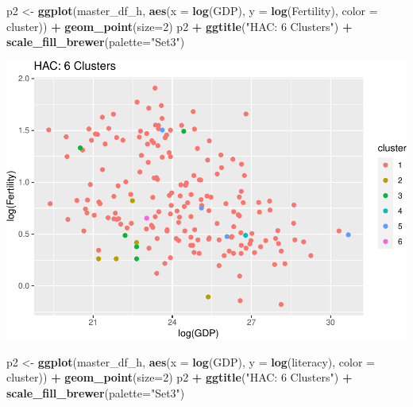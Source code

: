 \documentclass[]{article}
\newenvironment{Shaded}{\begin{snugshade}}{\end{snugshade}}
\newcommand{\DataTypeTok}[1]{\textcolor[rgb]{0.13,0.29,0.53}{#1}}
\newcommand{\DecValTok}[1]{\textcolor[rgb]{0.00,0.00,0.81}{#1}}
\newcommand{\KeywordTok}[1]{\textcolor[rgb]{0.13,0.29,0.53}{\textbf{#1}}}
\newcommand{\NormalTok}[1]{#1}
\newcommand{\OperatorTok}[1]{\textcolor[rgb]{0.81,0.36,0.00}{\textbf{#1}}}
\newcommand{\StringTok}[1]{\textcolor[rgb]{0.31,0.60,0.02}{#1}}
\begin{document}
\begin{Shaded}
\begin{Highlighting}[]
\NormalTok{p2 <-}\StringTok{ }\KeywordTok{ggplot}\NormalTok{(master_df_h, }\KeywordTok{aes}\NormalTok{(}\DataTypeTok{x =} \KeywordTok{log}\NormalTok{(GDP), }\DataTypeTok{y =} \KeywordTok{log}\NormalTok{(Fertility), }\DataTypeTok{color =}\NormalTok{ cluster)) }\OperatorTok{+}
\StringTok{  }\KeywordTok{geom_point}\NormalTok{(}\DataTypeTok{size=}\DecValTok{2}\NormalTok{)}
\NormalTok{p2 }\OperatorTok{+}\StringTok{ }\KeywordTok{ggtitle}\NormalTok{(}\StringTok{"HAC: 6 Clusters"}\NormalTok{) }\OperatorTok{+}\StringTok{ }\KeywordTok{scale_fill_brewer}\NormalTok{(}\DataTypeTok{palette=}\StringTok{"Set3"}\NormalTok{)}
\end{Highlighting}
\end{Shaded}

\includegraphics{eda_files/figure-latex/unnamed-chunk-27-3.pdf}

\begin{Shaded}
\begin{Highlighting}[]
\NormalTok{p2 <-}\StringTok{ }\KeywordTok{ggplot}\NormalTok{(master_df_h, }\KeywordTok{aes}\NormalTok{(}\DataTypeTok{x =} \KeywordTok{log}\NormalTok{(GDP), }\DataTypeTok{y =} \KeywordTok{log}\NormalTok{(literacy), }\DataTypeTok{color =}\NormalTok{ cluster)) }\OperatorTok{+}
\StringTok{  }\KeywordTok{geom_point}\NormalTok{(}\DataTypeTok{size=}\DecValTok{2}\NormalTok{)}
\NormalTok{p2 }\OperatorTok{+}\StringTok{ }\KeywordTok{ggtitle}\NormalTok{(}\StringTok{"HAC: 6 Clusters"}\NormalTok{) }\OperatorTok{+}\StringTok{ }\KeywordTok{scale_fill_brewer}\NormalTok{(}\DataTypeTok{palette=}\StringTok{"Set3"}\NormalTok{)}
\end{Highlighting}
\end{Shaded}
\end{document}
